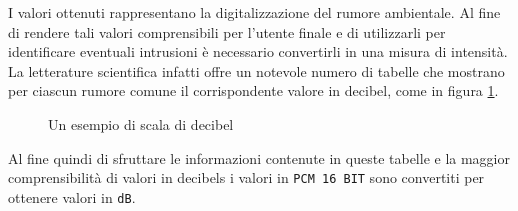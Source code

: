I valori ottenuti rappresentano la digitalizzazione del rumore ambientale. Al fine di rendere tali valori comprensibili per l'utente finale e di utilizzarli per identificare eventuali intrusioni è necessario convertirli in una misura di intensità. La letterature scientifica infatti offre un notevole numero di tabelle che mostrano per ciascun rumore comune il corrispondente valore in decibel, come in figura \ref{img:decibels}. 

\begin{figure}[!ht]
\begin{center}
\caption{Un esempio di scala di decibel}
\label{img:decibels}
\end{center}
\end{figure}

Al fine quindi di sfruttare le informazioni contenute in queste tabelle e la maggior comprensibilità di valori in decibels i valori in \texttt{PCM 16 BIT} sono convertiti per ottenere valori in \texttt{dB}.\\

